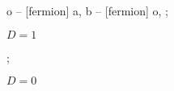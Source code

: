 \begin{figure}[H]
\begin{subfigure}{.33\linewidth}
{            o -- [fermion] a,
            b -- [fermion] o,
        };
        \caption{$D = 1$}
        \label{subfig:superficially_divergent_diagrams:f}
    \end{subfigure}
    \begin{subfigure}{.33\linewidth}
        \centering
        ;
        \caption{$D = 0$}
        \label{subfig:superficially_divergent_diagrams:g}
    \end{subfigure}
    \caption{
	}
    \label{fig:superficially_divergent_diagrams}
\end{figure}

